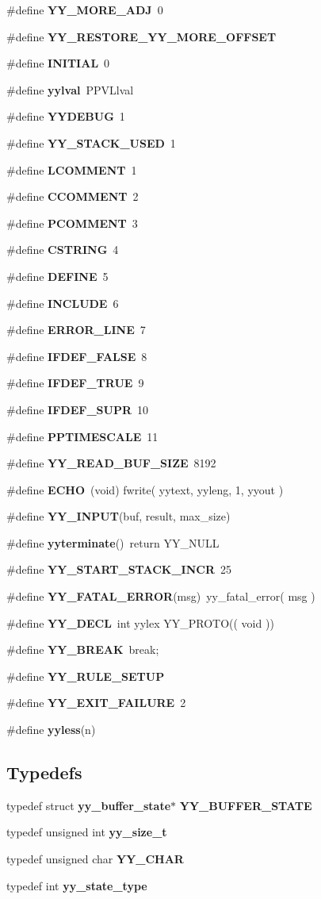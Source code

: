 \begin{CompactItemize}
\#define {\bf YY\_\-MORE\_\-ADJ}\ 0
\item 
\#define {\bf YY\_\-RESTORE\_\-YY\_\-MORE\_\-OFFSET}
\item 
\#define {\bf INITIAL}\ 0
\item 
\#define {\bf yylval}\ PPVLlval
\item 
\#define {\bf YYDEBUG}\ 1
\item 
\#define {\bf YY\_\-STACK\_\-USED}\ 1
\item 
\#define {\bf LCOMMENT}\ 1
\item 
\#define {\bf CCOMMENT}\ 2
\item 
\#define {\bf PCOMMENT}\ 3
\item 
\#define {\bf CSTRING}\ 4
\item 
\#define {\bf DEFINE}\ 5
\item 
\#define {\bf INCLUDE}\ 6
\item 
\#define {\bf ERROR\_\-LINE}\ 7
\item 
\#define {\bf IFDEF\_\-FALSE}\ 8
\item 
\#define {\bf IFDEF\_\-TRUE}\ 9
\item 
\#define {\bf IFDEF\_\-SUPR}\ 10
\item 
\#define {\bf PPTIMESCALE}\ 11
\item 
\#define {\bf YY\_\-READ\_\-BUF\_\-SIZE}\ 8192
\item 
\#define {\bf ECHO}\ (void) fwrite( yytext, yyleng, 1, yyout )
\item 
\#define {\bf YY\_\-INPUT}(buf, result, max\_\-size)
\item 
\#define {\bf yyterminate}()\ return YY\_\-NULL
\item 
\#define {\bf YY\_\-START\_\-STACK\_\-INCR}\ 25
\item 
\#define {\bf YY\_\-FATAL\_\-ERROR}(msg)\ yy\_\-fatal\_\-error( msg )
\item 
\#define {\bf YY\_\-DECL}\ int yylex YY\_\-PROTO(( void ))
\item 
\#define {\bf YY\_\-BREAK}\ break;
\item 
\#define {\bf YY\_\-RULE\_\-SETUP}
\item 
\#define {\bf YY\_\-EXIT\_\-FAILURE}\ 2
\item 
\#define {\bf yyless}(n)
\end{CompactItemize}
\subsection*{Typedefs}
\begin{CompactItemize}
\item 
typedef struct {\bf yy\_\-buffer\_\-state}$\ast$ {\bf YY\_\-BUFFER\_\-STATE}
\item 
typedef unsigned int {\bf yy\_\-size\_\-t}
\item 
typedef unsigned char {\bf YY\_\-CHAR}
\item 
typedef int {\bf yy\_\-state\_\-type}
\end{CompactItemize}
